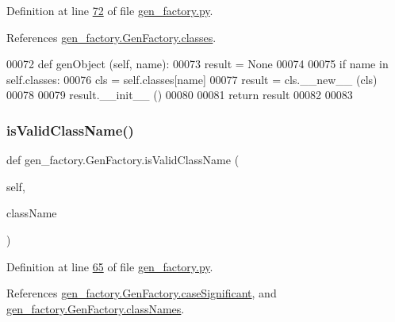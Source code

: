 Definition at line \hyperlink{gen__factory_8py_source_l00072}{72} of file \hyperlink{gen__factory_8py_source}{gen\+\_\+factory.\+py}.



References \hyperlink{gen__factory_8py_source_l00038}{gen\+\_\+factory.\+Gen\+Factory.\+classes}.


\begin{DoxyCode}
00072     \textcolor{keyword}{def }genObject (self, name):
00073         result = \textcolor{keywordtype}{None} 
00074         
00075         \textcolor{keywordflow}{if} name \textcolor{keywordflow}{in} self.classes:
00076                 cls = self.classes[name]
00077                 result = cls.\_\_new\_\_ (cls)
00078                 
00079                 result.\_\_init\_\_ ()
00080                 
00081         \textcolor{keywordflow}{return} result
00082     
00083         
\end{DoxyCode}
\mbox{\label{classgen__factory_1_1_gen_factory_ae778039c093668c28d6ea32c92ff082c}} 
\subsubsection{\texorpdfstring{is\+Valid\+Class\+Name()}{isValidClassName()}}
{\footnotesize\ttfamily def gen\+\_\+factory.\+Gen\+Factory.\+is\+Valid\+Class\+Name (\begin{DoxyParamCaption}\item[{}]{self,  }\item[{}]{class\+Name }\end{DoxyParamCaption})}



Definition at line \hyperlink{gen__factory_8py_source_l00065}{65} of file \hyperlink{gen__factory_8py_source}{gen\+\_\+factory.\+py}.



References \hyperlink{gen__factory_8py_source_l00045}{gen\+\_\+factory.\+Gen\+Factory.\+case\+Significant}, and \hyperlink{gen__factory_8py_source_l00056}{gen\+\_\+factory.\+Gen\+Factory.\+class\+Names}.


